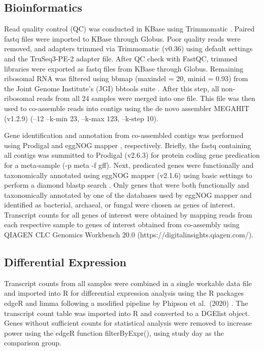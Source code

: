 \documentclass[
  sn-nature,
  lineno, referee]{sn-jnl}
\begin{document}
\subsection{Bioinformatics}\label{bioinformatics}

Read quality control (QC) was conducted in KBase
\citep{arkin_kbase_2018} using Trimmomatic
\citep{bolger_trimmomatic_2014}. Paired fastq files were imported to
KBase through Globus. Poor quality reads were removed, and adapters
trimmed via Trimmomatic (v0.36) using default settings and the
TruSeq3-PE-2 adapter file. After QC check with FastQC, trimmed libraries
were exported as fastq files from KBase through Globus. Remaining
ribosomal RNA was filtered using bbmap (maxindel = 20, minid = 0.93)
from the Joint Genome Institute's (JGI) bbtools suite
\citep{bushnell_bbmap_nodate}. After this step, all non-ribosomal reads
from all 24 samples were merged into one file. This file was then used
to co-assemble reads into contigs using the de novo assembler MEGAHIT
(v1.2.9) \citep{li_megahit_2015} (--12 --k-min 23, --k-max 123, --k-step
10).

Gene identification and annotation from co-assembled contigs was
performed using Prodigal \citep{hyatt_prodigal_2010} and eggNOG mapper
\citep{cantalapiedra_eggnog-mapper_2021}, respectively. Briefly, the
fastq containing all contigs was summitted to Prodigal (v2.6.3) for
protein coding gene predication for a meta-sample (-p meta -f gff).
Next, predicated genes were functionally and taxonomically annotated
using eggNOG mapper (v2.1.6) using basic settings to perform a diamond
blastp search \citep{buchfink_sensitive_2021}. Only genes that were both
functionally and taxonomically annotated by one of the databases used by
eggNOG mapper and identified as bacterial, archaeal, or fungal were
chosen as genes of interest. Transcript counts for all genes of interest
were obtained by mapping reads from each respective sample to genes of
interest obtained from co-assembly using QIAGEN CLC Genomics Workbench
20.0 (https://digitalinsights.qiagen.com/).

\subsection{Differential Expression}\label{differential-expression}

Transcript counts from all samples were combined in a single workable
data file and imported into R for differential expression analysis using
the R packages edgeR \citep{robinson_edger_2010} and limma
\citep{smyth_limma_2005} following a modified pipeline by Phipson et
al.~(2020) \citep{phipson_differential_2020}. The transcript count table
was imported into R and converted to a DGElist object. Genes without
sufficient counts for statistical analysis were removed to increase
power using the edgeR function filterByExpr(), using study day as the
comparison group.
\end{document}
